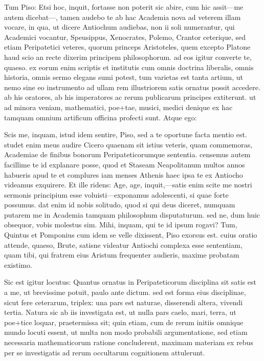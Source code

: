  Tum Piso: Etsi hoc, inquit, fortasse non poterit sic abire, cum hic assit—me autem dicebat—, tamen audebo te ab hac Academia nova ad veterem illam vocare, in qua, ut dicere Antiochum audiebas, non ii soli numerantur, qui Academici vocantur, Speusippus, Xenocrates, Polemo, Crantor ceterique, sed etiam Peripatetici veteres, quorum princeps Aristoteles, quem excepto Platone haud scio an recte dixerim principem philosophorum. ad eos igitur converte te, quaeso. ex eorum enim scriptis et institutis cum omnis doctrina liberalis, omnis historia, omnis sermo elegans sumi potest, tum varietas est tanta artium, ut nemo sine eo instrumento ad ullam rem illustriorem satis ornatus possit accedere. ab his oratores, ab his imperatores ac rerum publicarum principes extiterunt. ut ad minora veniam, mathematici, poe+tae, musici, medici denique ex hac tamquam omnium artificum officina profecti sunt. Atque ego:

 Scis me, inquam, istud idem sentire, Piso, sed a te oportune facta mentio est. studet enim meus audire Cicero quaenam sit istius veteris, quam commemoras, Academiae de finibus bonorum Peripateticorumque sententia. censemus autem facillime te id explanare posse, quod et Staseam Neapolitanum multos annos habueris apud te et complures iam menses Athenis haec ipsa te ex Antiocho videamus exquirere. Et ille ridens: Age, age, inquit,—satis enim scite me nostri sermonis principium esse voluisti—exponamus adolescenti, si quae forte possumus. dat enim id nobis solitudo, quod si qui deus diceret, numquam putarem me in Academia tamquam philosophum disputaturum. sed ne, dum huic obsequor, vobis molestus sim. Mihi, inquam, qui te id ipsum rogavi? Tum, Quintus et Pomponius cum idem se velle dixissent, Piso exorsus est. cuius oratio attende, quaeso, Brute, satisne videatur Antiochi complexa esse sententiam, quam tibi, qui fratrem eius Aristum frequenter audieris, maxime probatam existimo.

 Sic est igitur locutus: Quantus ornatus in Peripateticorum disciplina sit satis est a me, ut brevissime potuit, paulo ante dictum. sed est forma eius disciplinae, sicut fere ceterarum, triplex: una pars est naturae, disserendi altera, vivendi tertia. Natura sic ab iis investigata est, ut nulla pars caelo, mari, terra, ut poe+tice loquar, praetermissa sit; quin etiam, cum de rerum initiis omnique mundo locuti essent, ut multa non modo probabili argumentatione, sed etiam necessaria mathematicorum ratione concluderent, maximam materiam ex rebus per se investigatis ad rerum occultarum cognitionem attulerunt.

